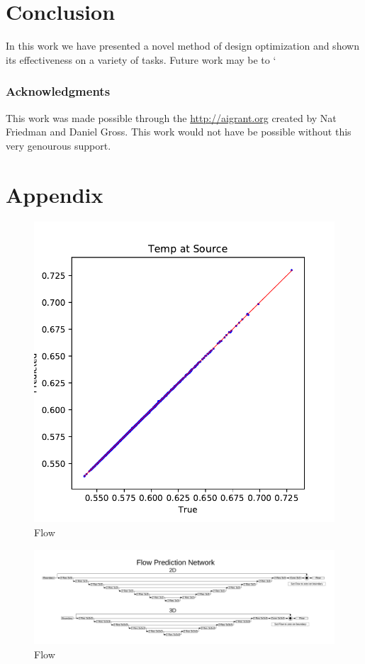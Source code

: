 \documentclass{article} %
\begin{document}
\section{Conclusion}

In this work we have presented a novel method of design optimization and shown its effectiveness on a variety of tasks. Future work may be to `

\subsubsection*{Acknowledgments}

This work was made possible through the \url{http://aigrant.org} created by Nat Friedman and Daniel Gross. This work would not have be possible without this very genourous support.




\section{Appendix}

\begin{figure}[h]
\begin{center}
\includegraphics[scale=0.15]{../test/figs/heat_accuracy.pdf}
\end{center}
\caption{Flow}
\end{figure}


\begin{figure}[h]
\begin{center}
\includegraphics[scale=0.45]{./appendix_flow_net.pdf}
\end{center}
\caption{Flow}
\end{figure}
\end{document}
